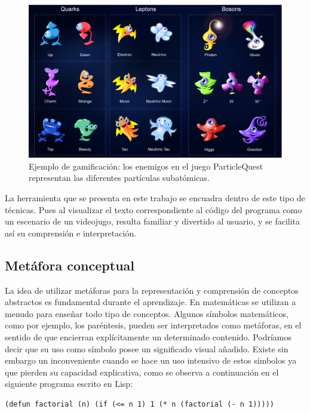 \documentclass{llncs}
\begin{document}
\begin{figure}[ht]
\begin{center}
\includegraphics[scale=0.3]{images/particlequest.eps}
\caption{Ejemplo de gamificación: los enemigos en el juego ParticleQuest representan las diferentes partículas subatómicas.
\label{fig:particlequest}}
\end{center}
\end{figure}

La herramienta que se presenta en este trabajo se encuadra dentro de este tipo de técnicas. Pues al visualizar el texto correspondiente al código del programa como un escenario de un videojugo, resulta familiar y divertido al usuario, y se facilita así su comprensión e interpretación.

\subsection{Metáfora conceptual}

La idea de utilizar metáforas para la representación y comprensión de conceptos abstractos es fundamental durante el aprendizaje. En matemáticas se utilizan a menudo para enseñar todo tipo de conceptos. Algunos símbolos matemáticos, como por ejemplo, los paréntesis, pueden ser interpretados como metáforas, en el sentido de que encierran explícitamente un determinado contenido. Podríamos decir que su uso como símbolo posee un significado visual añadido. Existe sin embargo un inconveniente cuando se hace un uso intensivo de estos símbolos ya que pierden su capacidad explicativa, como se observa a continuación en el siguiente programa escrito en Lisp:

\begin{verbatim}
(defun factorial (n) (if (<= n 1) 1 (* n (factorial (- n 1)))))
\end{verbatim}
\end{document}
